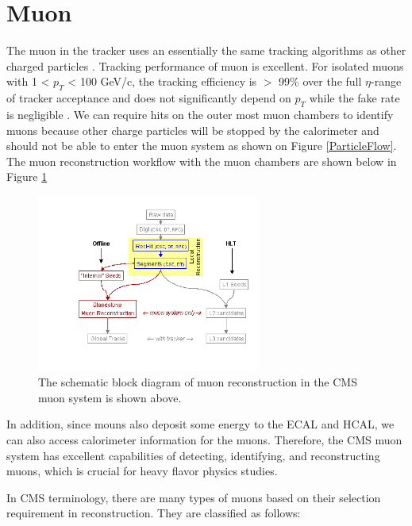 \section{Muon}

The muon in the tracker uses an essentially the same tracking algorithms as other charged particles \cite{CMSTrackComp}. Tracking performance of muon is excellent. For isolated muons with 1 < $p_T$ < 100 GeV/c, the tracking efficiency is $>$ 99\% over the full $\eta$-range of tracker acceptance and does not significantly depend on $p_T$ while the fake rate is negligible \cite{CMSTrackComp}. We can require hits on the outer most muon chambers to identify muons because other charge particles will be stopped by the calorimeter and should not be able to enter the muon system as shown on Figure \ref{ParticleFlow}. The muon reconstruction workflow with the muon chambers are shown below in Figure \ref{MuonReco}


\begin{figure}[hbtp]
\begin{center}
\includegraphics[width=0.65\textwidth]{Figures/Chapter4/MuonReco.png}
\caption{The schematic block diagram of muon reconstruction in the CMS muon system is shown above.}
\label{MuonReco}
\end{center}
\end{figure} 

In addition, since mouns also deposit some energy to the ECAL and HCAL, we can also access calorimeter information for the muons. Therefore, the CMS muon system has excellent capabilities of detecting, identifying, and reconstructing muons, which is crucial for heavy flavor physics studies. 

In CMS terminology, there are many types of muons based on their selection requirement in reconstruction. They are classified as follows:


